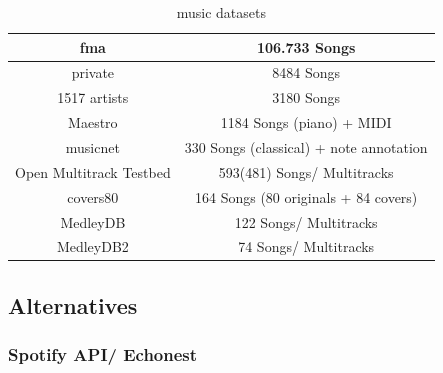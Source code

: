 \begin{table}[h]
	\begin{center}
		\begin{tabular}{|c||c|}
			\hline
			fma & 106.733 Songs\\
			\hline
			private & 8484 Songs\\
			\hline
			1517 artists & 3180 Songs\\
			\hline
			Maestro & 1184 Songs (piano) + MIDI\\
			\hline
			musicnet & 330 Songs (classical) + note annotation\\
			\hline
			Open Multitrack Testbed & 593(481) Songs/ Multitracks\\
			\hline
			covers80 & 164 Songs (80 originals + 84 covers)\\
			\hline
			MedleyDB &  122 Songs/ Multitracks\\
			\hline
			MedleyDB2 &  74 Songs/ Multitracks\\
			\hline
		\end{tabular}
	\end{center}
	\caption{music datasets}
	\label{table_dsets}
\end{table}

\subsection{Alternatives}

\subsubsection{Spotify API/ Echonest}\label{spotipy}

